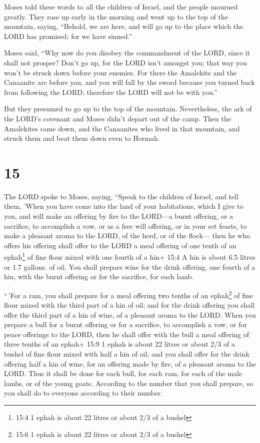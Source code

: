  Moses told these words to all the children of Israel, and
the people mourned greatly.  They rose up early in the
morning and went up to the top of the mountain, saying, ``Behold, we are
here, and will go up to the place which the LORD has promised; for we
have sinned.''

 Moses said, ``Why now do you disobey the commandment of
the LORD, since it shall not prosper?  Don't go up, for the
LORD isn't amongst you; that way you won't be struck down before your
enemies.  For there the Amalekite and the Canaanite are
before you, and you will fall by the sword because you turned back from
following the LORD; therefore the LORD will not be with you.''

 But they presumed to go up to the top of the mountain.
Nevertheless, the ark of the LORD's covenant and Moses didn't depart out
of the camp.  Then the Amalekites came down, and the
Canaanites who lived in that mountain, and struck them and beat them
down even to Hormah.

\hypertarget{section-14}{%
\section{15}\label{section-14}}

 The LORD spoke to Moses, saying,  ``Speak to
the children of Israel, and tell them, 'When you have come into the land
of your habitations, which I give to you,  and will make an
offering by fire to the LORD---a burnt offering, or a sacrifice, to
accomplish a vow, or as a free will offering, or in your set feasts, to
make a pleasant aroma to the LORD, of the herd, or of the flock---
 then he who offers his offering shall offer to the LORD a
meal offering of one tenth of an ephah\footnote{15:4 1 ephah is about 22
  litres or about 2/3 of a bushel} of fine flour mixed with one fourth
of a hin+ 15:4 A hin is about 6.5 litres or 1.7 gallons. of oil.
 You shall prepare wine for the drink offering, one fourth
of a hin, with the burnt offering or for the sacrifice, for each lamb.

 ``\,'For a ram, you shall prepare for a meal offering two
tenths of an ephah\footnote{15:6 1 ephah is about 22 litres or about 2/3
  of a bushel} of fine flour mixed with the third part of a hin of oil;
 and for the drink offering you shall offer the third part
of a hin of wine, of a pleasant aroma to the LORD.  When you
prepare a bull for a burnt offering or for a sacrifice, to accomplish a
vow, or for peace offerings to the LORD,  then he shall
offer with the bull a meal offering of three tenths of an ephah+ 15:9 1
ephah is about 22 litres or about 2/3 of a bushel of fine flour mixed
with half a hin of oil;  and you shall offer for the drink
offering half a hin of wine, for an offering made by fire, of a pleasant
aroma to the LORD.  Thus it shall be done for each bull,
for each ram, for each of the male lambs, or of the young goats.
 According to the number that you shall prepare, so you
shall do to everyone according to their number.

